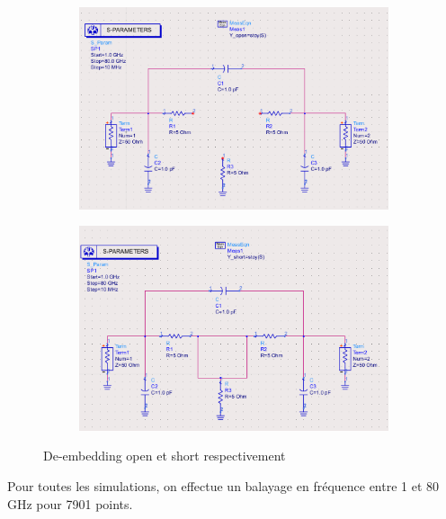 \documentclass[a4paper]{article}
\begin{document}
\begin{figure}[!htb]
  \begin{subfigure}[t]{.55\linewidth}
      \centering
      \includegraphics[width=1\linewidth]{de-embedding_open.png}
      \label{fig:de-embedding-open}
  \end{subfigure}%
  \begin{subfigure}[t]{.55\linewidth}
    \centering
    \includegraphics[width=0.99\linewidth]{de-embedding_short.png}
    \label{fig:de-embedding-short}
  \end{subfigure}%
  \caption{De-embedding open et short respectivement}
  \label{fig:de-embedding Phases}
\end{figure}

\clearpage

Pour toutes les simulations, on effectue un balayage en fr\'equence entre 1 et 80 GHz pour 7901 points.
\end{document}

